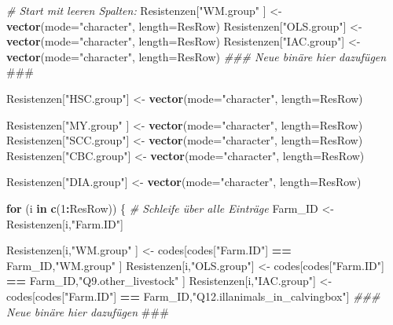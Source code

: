 \documentclass[
]{article}
\newenvironment{Shaded}{\begin{snugshade}}{\end{snugshade}}
\newcommand{\AlertTok}[1]{\textcolor[rgb]{0.94,0.16,0.16}{#1}}
\newcommand{\CommentTok}[1]{\textcolor[rgb]{0.56,0.35,0.01}{\textit{#1}}}
\newcommand{\ControlFlowTok}[1]{\textcolor[rgb]{0.13,0.29,0.53}{\textbf{#1}}}
\newcommand{\DataTypeTok}[1]{\textcolor[rgb]{0.13,0.29,0.53}{#1}}
\newcommand{\DecValTok}[1]{\textcolor[rgb]{0.00,0.00,0.81}{#1}}
\newcommand{\KeywordTok}[1]{\textcolor[rgb]{0.13,0.29,0.53}{\textbf{#1}}}
\newcommand{\NormalTok}[1]{#1}
\newcommand{\OperatorTok}[1]{\textcolor[rgb]{0.81,0.36,0.00}{\textbf{#1}}}
\newcommand{\StringTok}[1]{\textcolor[rgb]{0.31,0.60,0.02}{#1}}
\begin{document}
\begin{Shaded}
\begin{Highlighting}[]
\CommentTok{# Start mit leeren Spalten:}
\NormalTok{Resistenzen[}\StringTok{"WM.group"}\NormalTok{ ] <-}\StringTok{ }\KeywordTok{vector}\NormalTok{(}\DataTypeTok{mode=}\StringTok{"character"}\NormalTok{, }\DataTypeTok{length=}\NormalTok{ResRow)               }
\NormalTok{Resistenzen[}\StringTok{"OLS.group"}\NormalTok{] <-}\StringTok{ }\KeywordTok{vector}\NormalTok{(}\DataTypeTok{mode=}\StringTok{"character"}\NormalTok{, }\DataTypeTok{length=}\NormalTok{ResRow)               }
\NormalTok{Resistenzen[}\StringTok{"IAC.group"}\NormalTok{] <-}\StringTok{ }\KeywordTok{vector}\NormalTok{(}\DataTypeTok{mode=}\StringTok{"character"}\NormalTok{, }\DataTypeTok{length=}\NormalTok{ResRow)  }
\CommentTok{### Neue binäre hier dazufügen }\AlertTok{###}

\NormalTok{Resistenzen[}\StringTok{"HSC.group"}\NormalTok{] <-}\StringTok{ }\KeywordTok{vector}\NormalTok{(}\DataTypeTok{mode=}\StringTok{"character"}\NormalTok{, }\DataTypeTok{length=}\NormalTok{ResRow)              }

\NormalTok{Resistenzen[}\StringTok{"MY.group"}\NormalTok{ ] <-}\StringTok{ }\KeywordTok{vector}\NormalTok{(}\DataTypeTok{mode=}\StringTok{"character"}\NormalTok{, }\DataTypeTok{length=}\NormalTok{ResRow)               }
\NormalTok{Resistenzen[}\StringTok{"SCC.group"}\NormalTok{] <-}\StringTok{ }\KeywordTok{vector}\NormalTok{(}\DataTypeTok{mode=}\StringTok{"character"}\NormalTok{, }\DataTypeTok{length=}\NormalTok{ResRow)              }
\NormalTok{Resistenzen[}\StringTok{"CBC.group"}\NormalTok{] <-}\StringTok{ }\KeywordTok{vector}\NormalTok{(}\DataTypeTok{mode=}\StringTok{"character"}\NormalTok{, }\DataTypeTok{length=}\NormalTok{ResRow)        }

\NormalTok{Resistenzen[}\StringTok{"DIA.group"}\NormalTok{] <-}\StringTok{ }\KeywordTok{vector}\NormalTok{(}\DataTypeTok{mode=}\StringTok{"character"}\NormalTok{, }\DataTypeTok{length=}\NormalTok{ResRow)              }

\ControlFlowTok{for}\NormalTok{ (i }\ControlFlowTok{in} \KeywordTok{c}\NormalTok{(}\DecValTok{1}\OperatorTok{:}\NormalTok{ResRow)) \{                  }\CommentTok{# Schleife über alle Einträge }
\NormalTok{  Farm_ID <-}\StringTok{ }\NormalTok{Resistenzen[i,}\StringTok{"Farm.ID"}\NormalTok{] }
  
\NormalTok{  Resistenzen[i,}\StringTok{"WM.group"}\NormalTok{ ] <-}\StringTok{ }\NormalTok{codes[codes[}\StringTok{"Farm.ID"}\NormalTok{] }\OperatorTok{==}\StringTok{ }\NormalTok{Farm_ID,}\StringTok{"WM.group"}\NormalTok{                    ]  }
\NormalTok{  Resistenzen[i,}\StringTok{"OLS.group"}\NormalTok{] <-}\StringTok{ }\NormalTok{codes[codes[}\StringTok{"Farm.ID"}\NormalTok{] }\OperatorTok{==}\StringTok{ }\NormalTok{Farm_ID,}\StringTok{"Q9.other_livestock"}\NormalTok{          ]             }
\NormalTok{  Resistenzen[i,}\StringTok{"IAC.group"}\NormalTok{] <-}\StringTok{ }\NormalTok{codes[codes[}\StringTok{"Farm.ID"}\NormalTok{] }\OperatorTok{==}\StringTok{ }\NormalTok{Farm_ID,}\StringTok{"Q12.illanimals_in_calvingbox"}\NormalTok{]  }
  \CommentTok{### Neue binäre hier dazufügen }\AlertTok{###}
    

\end{Highlighting}
\end{Shaded}
\end{document}
